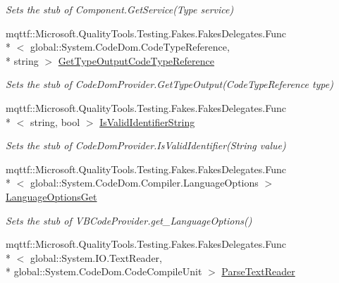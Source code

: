\begin{DoxyCompactItemize}
\begin{DoxyCompactList}\small\item\em Sets the stub of Component.\-Get\-Service(\-Type service)\end{DoxyCompactList}\item 
mqttf\-::\-Microsoft.\-Quality\-Tools.\-Testing.\-Fakes.\-Fakes\-Delegates.\-Func\\*
$<$ global\-::\-System.\-Code\-Dom.\-Code\-Type\-Reference, \\*
string $>$ \hyperlink{class_microsoft_1_1_visual_basic_1_1_fakes_1_1_stub_v_b_code_provider_ac01cc34d50084d26c9090a73d11068ac}{Get\-Type\-Output\-Code\-Type\-Reference}
\begin{DoxyCompactList}\small\item\em Sets the stub of Code\-Dom\-Provider.\-Get\-Type\-Output(\-Code\-Type\-Reference type)\end{DoxyCompactList}\item 
mqttf\-::\-Microsoft.\-Quality\-Tools.\-Testing.\-Fakes.\-Fakes\-Delegates.\-Func\\*
$<$ string, bool $>$ \hyperlink{class_microsoft_1_1_visual_basic_1_1_fakes_1_1_stub_v_b_code_provider_a9a5d16fdd964d212aa97a4d515fced60}{Is\-Valid\-Identifier\-String}
\begin{DoxyCompactList}\small\item\em Sets the stub of Code\-Dom\-Provider.\-Is\-Valid\-Identifier(\-String value)\end{DoxyCompactList}\item 
mqttf\-::\-Microsoft.\-Quality\-Tools.\-Testing.\-Fakes.\-Fakes\-Delegates.\-Func\\*
$<$ global\-::\-System.\-Code\-Dom.\-Compiler.\-Language\-Options $>$ \hyperlink{class_microsoft_1_1_visual_basic_1_1_fakes_1_1_stub_v_b_code_provider_aa22c00534da7a62234c4d8e909da02e0}{Language\-Options\-Get}
\begin{DoxyCompactList}\small\item\em Sets the stub of V\-B\-Code\-Provider.\-get\-\_\-\-Language\-Options()\end{DoxyCompactList}\item 
mqttf\-::\-Microsoft.\-Quality\-Tools.\-Testing.\-Fakes.\-Fakes\-Delegates.\-Func\\*
$<$ global\-::\-System.\-I\-O.\-Text\-Reader, \\*
global\-::\-System.\-Code\-Dom.\-Code\-Compile\-Unit $>$ \hyperlink{class_microsoft_1_1_visual_basic_1_1_fakes_1_1_stub_v_b_code_provider_a6e8858c1aff550db4cd7dc8dcc49606f}{Parse\-Text\-Reader}

\end{DoxyCompactItemize}
